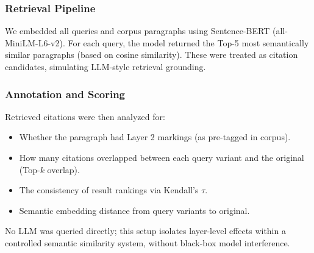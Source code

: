\subsubsection{Retrieval Pipeline}
We embedded all queries and corpus paragraphs using Sentence-BERT (all-MiniLM-L6-v2). For each query, the model returned the Top-5 most semantically similar paragraphs (based on cosine similarity). These were treated as citation candidates, simulating LLM-style retrieval grounding.

\subsubsection{Annotation and Scoring}
Retrieved citations were then analyzed for:
\begin{itemize}
  \item Whether the paragraph had Layer 2 markings (as pre-tagged in corpus).
  \item How many citations overlapped between each query variant and the original (Top-$k$ overlap).
  \item The consistency of result rankings via Kendall’s $\tau$.
  \item Semantic embedding distance from query variants to original.
\end{itemize}
No LLM was queried directly; this setup isolates layer-level effects within a controlled semantic similarity system, without black-box model interference.
